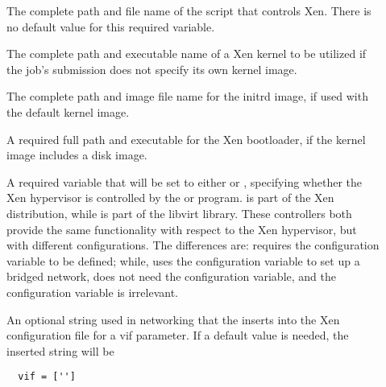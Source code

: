 \begin{description}


\item[]
  \label{param:XenScript}
  The complete path and file name of the script that controls Xen.
  There is no default value for this required variable.

\item[]
  \label{param:XenDefaultKernel}
  The complete path and executable name of a Xen kernel to be utilized
  if the job's submission does not specify its own kernel image.

\item[]
  \label{param:XenDefaultInitrd}
  The complete path and image file name for the initrd image,
  if used with the default kernel image.

\item[]
  \label{param:XenBootloader}
  A required full path and executable for the Xen bootloader,
  if the kernel image includes a disk image.

\item[]
  \label{param:XenController}
  A required variable that will be set to either
   or ,
  specifying whether the Xen hypervisor is 
  controlled by the  or  program.
   is part of the Xen distribution,
  while  is part of the libvirt library.
  These controllers both provide the same functionality 
  with respect to the Xen hypervisor, but with different configurations.
  The differences are: 
  requires the  configuration variable
  to be defined; 
  while,  uses the  
  configuration variable to set up a bridged network,
  does not need the  configuration variable,
  and the configuration variable
   is irrelevant.

\item[]
  \label{param:XenVIFParameter}
  An optional string used in networking that the 
  inserts into the Xen configuration file for a vif parameter.
  If a default value is needed, the inserted string will be
  \begin{verbatim}
  vif = ['']
  \end{verbatim}


\end{description}

